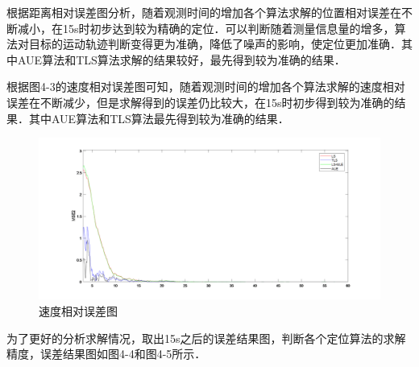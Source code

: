 根据距离相对误差图分析，随着观测时间的增加各个算法求解的位置相对误差在不断减小，在15s时初步达到较为精确的定位．可以判断随着测量信息量的增多，算法对目标的运动轨迹判断变得更为准确，降低了噪声的影响，使定位更加准确．其中AUE算法和TLS算法求解的结果较好，最先得到较为准确的结果．

根据图4-3的速度相对误差图可知，随着观测时间的增加各个算法求解的速度相对误差在不断减少，但是求解得到的误差仍比较大，在15s时初步得到较为准确的结果．其中AUE算法和TLS算法最先得到较为准确的结果．
\newpage
\begin{figure}[htbp]
	\vspace{6pt}
	\centering
	\includegraphics[width=\linewidth]{images/line_v.png}
	\caption{速度相对误差图}
\end{figure}

为了更好的分析求解情况，取出15s之后的误差结果图，判断各个定位算法的求解精度，误差结果图如图4-4和图4-5所示．


